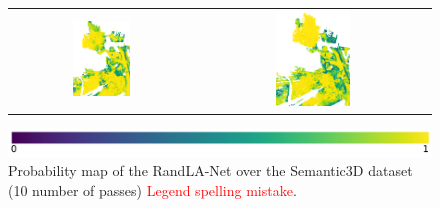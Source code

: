 \begin{figure}[h!]
\begin{tabular}{cc}
            \includegraphics[width=0.33\textwidth, height=0.18\textheight]{images/ood_imgs/fout_sem3d/fout_prob_3.png}&
            \includegraphics[width=0.33\textwidth, height=0.18\textheight]{images/sem3d_of/fout_prob_sem3d_of_3.png}\\
        \end{tabular}
        \includegraphics[scale=0.45]{images/prob_legend.pdf}
        \caption{Probability map of the RandLA-Net over the Semantic3D dataset (10 number of passes) \textcolor{red}{Legend spelling mistake}.}
        \label{fig:fout_probmap_vis_sem3d_OF}
    \end{figure} 
    \FloatBarrier
